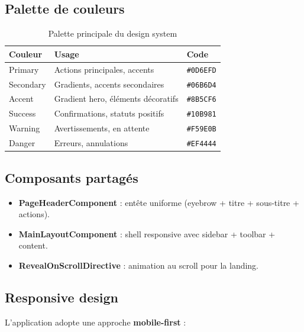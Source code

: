 \documentclass[11pt,a4paper]{article}
\begin{document}
\subsection{Palette de couleurs}

\begin{table}[H]
\centering
\renewcommand{\arraystretch}{1.5}
\begin{tabularx}{\textwidth}{lXl}
\toprule
\rowcolor{primary!10}
\textbf{Couleur} & \textbf{Usage} & \textbf{Code} \\
\midrule
\cellcolor{primary}\color{white}Primary & Actions principales, accents & \texttt{\#0D6EFD} \\
\cellcolor{secondary}\color{white}Secondary & Gradients, accents secondaires & \texttt{\#06B6D4} \\
\cellcolor{accent}\color{white}Accent & Gradient hero, éléments décoratifs & \texttt{\#8B5CF6} \\
\cellcolor{success}\color{white}Success & Confirmations, statuts positifs & \texttt{\#10B981} \\
\cellcolor{warning}\color{white}Warning & Avertissements, en attente & \texttt{\#F59E0B} \\
\cellcolor{danger}\color{white}Danger & Erreurs, annulations & \texttt{\#EF4444} \\
\bottomrule
\end{tabularx}
\caption{Palette principale du design system}
\end{table}

\subsection{Composants partagés}

\begin{itemize}
  \item \textbf{PageHeaderComponent} : entête uniforme (eyebrow + titre + sous-titre + actions).
  \item \textbf{MainLayoutComponent} : shell responsive avec sidebar + toolbar + content.
  \item \textbf{RevealOnScrollDirective} : animation au scroll pour la landing.
\end{itemize}

\subsection{Responsive design}

L'application adopte une approche \textbf{mobile-first} :
\end{document}
